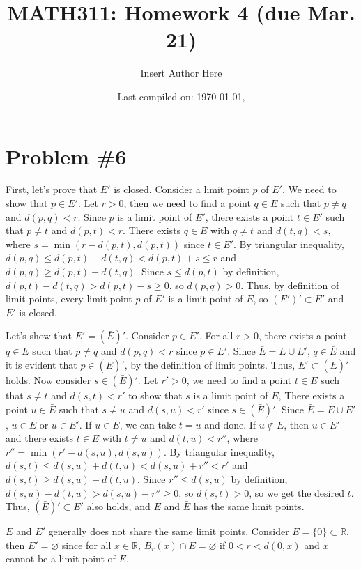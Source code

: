 \documentclass{scrartcl}
\title{MATH311: Homework 4 (due Mar. 21)}
\author{Insert Author Here}
\date{Last compiled on: \today, \currenttime}
\begin{document}
\maketitle

\section{Problem \#6}
First, let's prove that \(E'\) is closed.
Consider a limit point \(p\) of \(E'\).
We need to show that \(p \in E'\).
Let \(r > 0\), then we need to find a point \(q \in E\) such that \(p \not = q\) and \(d(p, q) < r\).
Since \(p\) is a limit point of \(E'\), there exists a point \(t \in E'\) such that \(p \not = t\) and \(d(p, t) < r\).
There exists \(q \in E\) with \(q \not = t\) and \(d(t, q) < s\), where \(s = \min(r - d(p, t), d(p, t))\) since \(t \in E'\).
By triangular inequality, \(d(p, q) \leq d(p, t) + d(t, q) < d(p, t) + s \leq r\) and \(d(p, q) \geq d(p, t) - d(t, q)\).
Since \(s \leq d(p, t)\) by definition, \(d(p, t) - d(t, q) > d(p, t) - s \geq 0\), so \(d(p, q) > 0\).
Thus, by definition of limit points, every limit point \(p\) of \(E'\) is a limit point of \(E\), so \((E')' \subset E'\) and \(E'\) is closed.

Let's show that \(E' = (\bar{E})'\).
Consider \(p \in E'\).
For all \(r > 0\), there exists a point \(q \in E\) such that \(p \not = q\) and \(d(p, q) < r\) since \(p \in E'\).
Since \(\bar{E} = E \cup E'\), \(q \in \bar{E}\) and it is evident that \(p \in (\bar{E})'\), by the definition of limit points.
Thus, \(E' \subset (\bar{E})'\) holds.
Now consider \(s \in (\bar{E})'\).
Let \(r' > 0\), we need to find a point \(t \in E\) such that \(s \not = t\) and \(d(s, t) < r'\) to show that \(s\) is a limit point of \(E\),
There exists a point \(u \in \bar{E}\) such that \(s \not = u\) and \(d(s, u) < r'\) since \(s \in (\bar{E})'\).
Since \(\bar{E} = E \cup E'\), \(u \in E\) or \(u \in E'\).
If \(u \in E\), we can take \(t = u\) and done.
If \(u \not \in E\), then \(u \in E'\) and there exists \(t \in E\) with \(t \not = u\) and \(d(t, u) < r''\), where \(r'' = \min(r' - d(s, u), d(s, u))\).
By triangular inequality, \(d(s, t) \leq d(s, u) + d(t, u) < d(s, u) + r'' < r'\) and \(d(s, t) \geq d(s, u) - d(t, u)\).
Since \(r'' \leq d(s, u)\) by definition, \(d(s, u) - d(t, u) > d(s, u) - r'' \geq 0\), so \(d(s, t) > 0\), so we get the desired \(t\).
Thus, \((\bar{E})' \subset E'\) also holds, and \(E\) and \(\bar{E}\) has the same limit points.

\(E\) and \(E'\) generally does not share the same limit points.
Consider \(E = \{0\} \subset \mathbb{R}\), then \(E' = \varnothing\) since for all \(x \in \mathbb{R}\), \(B_r(x) \cap E = \varnothing\) if \(0 < r < d(0, x)\) and \(x\) cannot be a limit point of \(E\).
\end{document}
